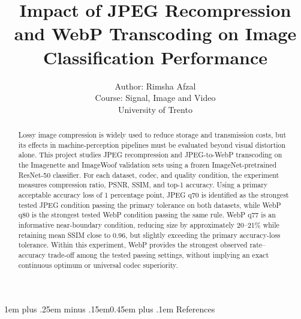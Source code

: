 \documentclass[10pt,a4paper]{article}
\title{Impact of JPEG Recompression and WebP Transcoding on Image Classification Performance}
\author{Author: Rimsha Afzal\\Course: Signal, Image and Video\\University of Trento}
\date{}
\makeatletter
\renewcommand\section{\@startsection{section}{1}{\z@}%
  {1em plus .25em minus .15em}{0.45em plus .1em}%
  {\normalfont\Large\bfseries}}
\makeatother
\begin{document}
\maketitle

\begin{abstract}
Lossy image compression is widely used to reduce storage and transmission costs, but its effects in machine-perception pipelines must be evaluated beyond visual distortion alone. This project studies JPEG recompression and JPEG-to-WebP transcoding on the Imagenette and ImageWoof validation sets using a frozen ImageNet-pretrained ResNet-50 classifier. For each dataset, codec, and quality condition, the experiment measures compression ratio, PSNR, SSIM, and top-1 accuracy. Using a primary acceptable accuracy loss of 1 percentage point, JPEG q70 is identified as the strongest tested JPEG condition passing the primary tolerance on both datasets, while WebP q80 is the strongest tested WebP condition passing the same rule. WebP q77 is an informative near-boundary condition, reducing size by approximately 20--21\% while retaining mean SSIM close to 0.96, but slightly exceeding the primary accuracy-loss tolerance. Within this experiment, WebP provides the strongest observed rate--accuracy trade-off among the tested passing settings, without implying an exact continuous optimum or universal codec superiority.
\end{abstract}




\clearpage




\clearpage
{\small
\section{References}
\makeatletter
\renewcommand{\section}{\@ifstar\@gobble\@gobble}
\makeatother


}
\end{document}
